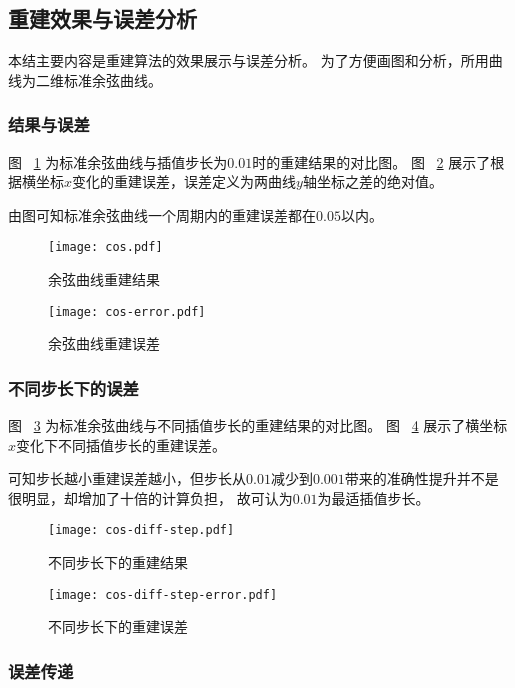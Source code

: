 \subsection{重建效果与误差分析}

本结主要内容是重建算法的效果展示与误差分析。
为了方便画图和分析，所用曲线为二维标准余弦曲线。

\subsubsection{结果与误差}

图 ~\ref{fig:cos} 为标准余弦曲线与插值步长为$0.01$时的重建结果的对比图。
图 ~\ref{fig:cos-error} 展示了根据横坐标$x$变化的重建误差，误差定义为两曲线$y$轴坐标之差的绝对值。

由图可知标准余弦曲线一个周期内的重建误差都在$0.05$以内。


\begin{figure}
\centering
\texttt{[image: cos.pdf]}
\caption{余弦曲线重建结果}
\label{fig:cos}
\end{figure}

\begin{figure}
\centering
\texttt{[image: cos-error.pdf]}
\caption{余弦曲线重建误差}
\label{fig:cos-error}
\end{figure}

\subsubsection{不同步长下的误差}

图 ~\ref{fig:cos-diff-step} 为标准余弦曲线与不同插值步长的重建结果的对比图。
图 ~\ref{fig:cos-diff-step-error} 展示了横坐标$x$变化下不同插值步长的重建误差。

可知步长越小重建误差越小，但步长从$0.01$减少到$0.001$带来的准确性提升并不是很明显，却增加了十倍的计算负担，
故可认为$0.01$为最适插值步长。

\begin{figure}
\centering
\texttt{[image: cos-diff-step.pdf]}
\caption{不同步长下的重建结果}
\label{fig:cos-diff-step}
\end{figure}

\begin{figure}
\centering
\texttt{[image: cos-diff-step-error.pdf]}
\caption{不同步长下的重建误差}
\label{fig:cos-diff-step-error}
\end{figure}

\subsubsection{误差传递}

